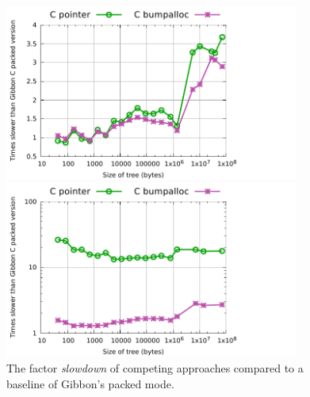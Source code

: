 \documentclass[a4paper,english]{lipics-v2016}
\newcommand{\treelang}{Gibbon\xspace} %
\begin{document}

\begin{figure}[t]
  \hspace{-5mm}
  \begin{minipage}{1.04\textwidth}
    \begin{minipage}{.49\textwidth}
      \centering
      \includegraphics[width=3.8in]{./figs/slowdown_countnodes.pdf}
    \end{minipage}
    \begin{minipage}{.49\textwidth}
      \includegraphics[width=3.8in]{./figs/slowdown_treewalk.pdf}
    \end{minipage}
  \end{minipage}
  \caption{The factor {\em slowdown} of competing approaches compared to a
    baseline of Gibbon's packed mode.}
  \label{fig:slowdown}
\end{figure}
      
\end{document}
